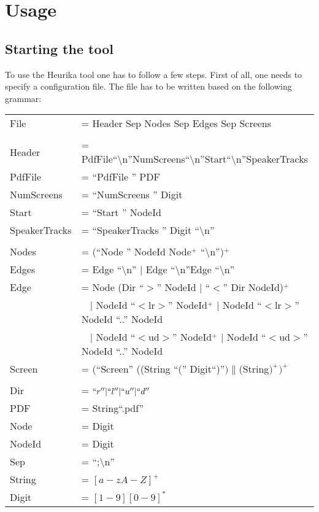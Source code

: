  \section{Usage}
 \subsection{Starting the tool}
    To use the Heurika tool one has to follow a few steps.
    First of all, one needs to specify a configuration file.
    The file has to be written based on the following grammar:\\	
	\begin{tabular}{p{3cm}l}
	    File &= Header Sep Nodes Sep Edges Sep Screens\\\\
	    
	    Header &= PdfFile``\textbackslash n''NumScreens``\textbackslash n''Start``\textbackslash n''SpeakerTracks\\
	    PdfFile &= ``PdfFile '' PDF\\
	    NumScreens &= ``NumScreens '' Digit\\
	    Start &= ``Start '' NodeId\\
	    SpeakerTracks &= ``SpeakerTracks '' Digit ``\textbackslash n''\\\\
	    
	    Nodes &= (``Node '' NodeId Node$^+$ ``\textbackslash n'')$^+$\\
	    
	    Edges &= Edge ``\textbackslash n'' $|$ Edge ``\textbackslash n''Edge ``\textbackslash n''\\
	    Edge &= Node (Dir ``$>$'' NodeId $|$ ``$<$'' Dir NodeId)$^+$ \\
	    &$\;\;$ $|$ NodeId ``$<$lr$>$'' NodeId$^+$ $|$ NodeId ``$<$lr$>$'' NodeId ``..'' NodeId\\
	    &$\;\;$ $|$ NodeId ``$<$ud$>$'' NodeId$^+$ $|$ NodeId ``$<$ud$>$'' NodeId ``..'' NodeId\\
	    
        Screen &= (``Screen'' ((String ``('' Digit``)''$)\|$(String$)^+)^+$\\\\
	    
        
        Dir &= $``r'' | ``l'' | ``u'' | ``d''$\\
        PDF &= String``.pdf''\\
        Node &= Digit\\
        NodeId &= Digit\\
        Sep &= ``;\textbackslash n''\\
        String &= $ [a-zA-Z]^+ $ \\
        Digit &= $[1-9][0-9]^*$ \\ 
	    
    \end{tabular}\\
    
